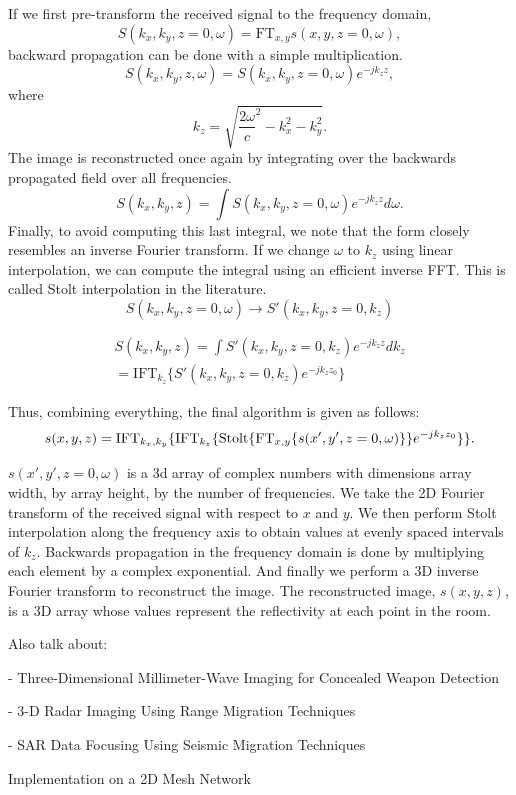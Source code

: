 \documentclass[twocolumn]{article}
\makeatletter
\def\section{\@startsection{section}{1}{\z@}{24pt plus 2 pt
minus 2 pt} {12pt plus 2pt minus 2pt}{\large\bf}}
\makeatother
\begin{document}
If we first pre-transform the received signal to the frequency domain, 
\[
S(k_x,k_y,z=0,\omega) = \text{FT}_{x,y} s(x, y, z=0, \omega),
\]
backward propagation can be done with a simple multiplication. 
\[
S(k_x, k_y, z, \omega) = S(k_x, k_y, z=0, \omega) e^{-j k_z z},
\]
where 
\[
k_z = \sqrt{ \frac{2 \omega}{c} ^ 2 - k_x^2 - k_y^2}.
\]
The image is reconstructed once again by integrating over the backwards propagated field over all frequencies.
\[
S(k_x, k_y, z) = \int S(k_x, k_y, z=0, \omega) e^{-j k_z z} d\omega.
\]
Finally, to avoid computing this last integral, we note that the form closely resembles an inverse Fourier transform. If we change $\omega$ to $k_z$ using linear interpolation, we can compute the integral using an efficient inverse FFT. This is called Stolt interpolation in the literature.
\[
S(k_x, k_y, z=0, \omega) \rightarrow S'(k_x, k_y, z=0, k_z)
\]

\begin{gather}
S(k_{x},k_{y},z)  =  \int S'(k_{x},k_{y},z=0,k_{z})e^{-jk_{z}z}dk_{z}\\
  =  \text{IFT}_{k_{z}}\{S'(k_{x},k_{y},z=0,k_{z})e^{-jk_{z}z_{0}}\}
\end{gather}

Thus, combining everything, the final algorithm is given as follows:
\[
s(x,y,z)=\text{IFT}_{k_{x},k_{y}}\{\text{IFT}_{k_{z}}\{\text{\text{Stolt}}\{\text{FT}_{x,y}\{s(x',y',z=0,\omega)\}\}e^{-jk_{z}z_{0}}\}\}.
\]

$s(x', y', z=0, \omega)$ is a 3d array of complex numbers with dimensions array width, by array height, by the number of frequencies. We take the 2D Fourier transform of the received signal with respect to $x$ and $y$. We then perform Stolt interpolation along the frequency axis to obtain values at evenly spaced intervals of $k_z$. Backwards propagation in the frequency domain is done by multiplying each element by a complex exponential. And finally we perform a 3D inverse Fourier transform to reconstruct the image. The reconstructed image, $s(x,y,z)$, is a 3D array whose values represent the reflectivity at each point in the room.

Also talk about:

- Three-Dimensional Millimeter-Wave Imaging for Concealed Weapon Detection

- 3-D Radar Imaging Using Range Migration Techniques

- SAR Data Focusing Using Seismic Migration Techniques

\section{Implementation on a 2D Mesh Network}
\end{document}

